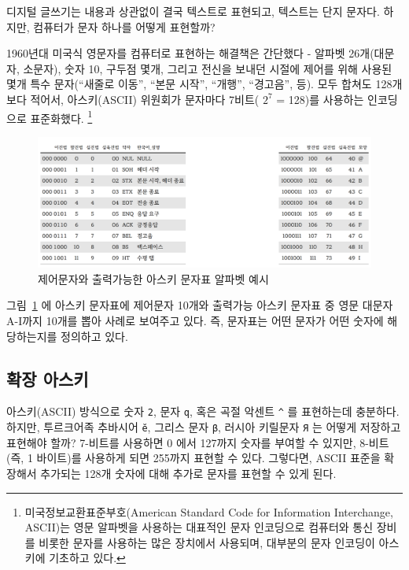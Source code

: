\documentclass[
  letterpaper,
]{book}
\begin{document}
디지털 글쓰기는 내용과 상관없이 결국 텍스트로 표현되고, 텍스트는 단지
문자다. 하지만, 컴퓨터가 문자 하나를 어떻게 표현할까?

1960년대 미국식 영문자를 컴퓨터로 표현하는 해결책은 간단했다 - 알파벳
26개(대문자, 소문자), 숫자 10, 구두점 몇개, 그리고 전신을 보내던 시절에
제어를 위해 사용된 몇개 특수 문자(``새줄로 이동'', ``본문 시작'',
``개행'', ``경고음'', 등). 모두 합쳐도 128개보다 적어서, 아스키(ASCII)
위원회가 문자마다 7비트( \(2^7\) = 128)를 사용하는 인코딩으로
표준화했다. \footnote{미국정보교환표준부호(American Standard Code for
  Information Interchange, ASCII)는 영문 알파벳을 사용하는 대표적인 문자
  인코딩으로 컴퓨터와 통신 장비를 비롯한 문자를 사용하는 많은 장치에서
  사용되며, 대부분의 문자 인코딩이 아스키에 기초하고 있다.}

\begin{figure}

{\centering \includegraphics{images/ascii_gt.png}

}

\caption{\label{fig-ascii}제어문자와 출력가능한 아스키 문자표 알파벳
예시}

\end{figure}

그림~\ref{fig-ascii} 에 아스키 문자표에 제어문자 10개와 출력가능 아스키
문자표 중 영문 대문자 A-I까지 10개를 뽑아 사례로 보여주고 있다. 즉,
문자표는 어떤 문자가 어떤 숫자에 해당하는지를 정의하고 있다.

\hypertarget{ascii-extension}{%
\subsection{확장 아스키}\label{ascii-extension}}

아스키(ASCII) 방식으로 숫자 \texttt{2}, 문자 \texttt{q}, 혹은 곡절
악센트 \texttt{\^{}} 를 표현하는데 충분하다. 하지만, 투르크어족 추바시어
\texttt{ĕ}, 그리스 문자 \texttt{β}, 러시아 키릴문자 \texttt{Я} 는 어떻게
저장하고 표현해야 할까? 7-비트를 사용하면 0 에서 127까지 숫자를 부여할
수 있지만, 8-비트(즉, 1 바이트)를 사용하게 되면 255까지 표현할 수 있다.
그렇다면, ASCII 표준을 확장해서 추가되는 128개 숫자에 대해 추가로 문자를
표현할 수 있게 된다.
\end{document}
